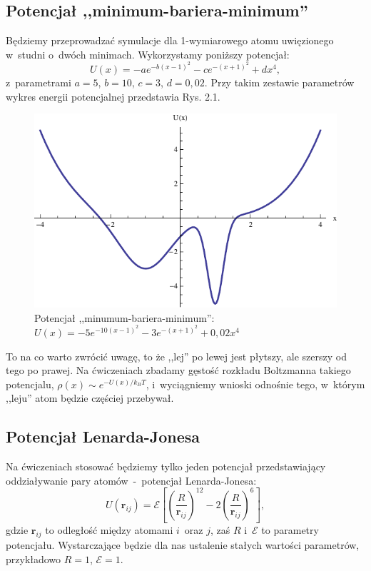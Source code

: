 \documentclass[a4paper,11pt,twoside]{book}
\begin{document}
\subsection{Potencjał ,,minimum-bariera-minimum''}
Będziemy przeprowadzać symulacje dla 1-wymiarowego atomu uwięzionego w~studni o~dwóch minimach. Wykorzystamy poniższy potencjał:
\begin{displaymath}
U(x)=-a e^{-b (x-1)^2}-c e^{-(x+1)^2}+d x^4,
\end{displaymath}
z~parametrami $a=5$, $b=10$, $c=3$, $d=0,02$. Przy takim zestawie parametrów wykres energii potencjalnej przedstawia Rys. 2.1.
\begin{figure}[h!]
\label{potencjal}
\caption[To należy zmienić]
{
Potencjał ,,minumum-bariera-minimum'':\\
\centering
$U(x)=-5 e^{-10 (x-1)^2}-3 e^{-(x+1)^2}+0,02 x^4$
}
\centering
\includegraphics[scale=0.9]{weberPotential}
\end{figure}
To na co warto zwrócić uwagę, to że ,,lej'' po lewej jest płytszy, ale szerszy od tego po prawej. Na ćwiczeniach zbadamy gęstość rozkładu Boltzmanna takiego potencjalu, $\rho (x)\sim e^{-U(x)/k_BT}$, i~wyciągniemy wnioski odnośnie tego, w~którym ,,leju'' atom będzie częściej przebywał.
\subsection{Potencjał Lenarda-Jonesa}
Na ćwiczeniach stosować będziemy tylko jeden potencjał przedstawiający oddziaływanie pary atomów~-~potencjał Lenarda-Jonesa:
\begin{displaymath}
U(\mathbf{r}_{ij}) = \mathcal{E} \left [ \left ( \frac{R}{\mathbf{r}_{ij}} \right )^{12} - 2 \left ( \frac{R}{\mathbf{r}_{ij}} \right )^6  \right ],
\end{displaymath}
gdzie $\mathbf{r}_{ij}$ to odległość między atomami $i$~oraz $j$, zaś $R$ i~$\mathcal{E}$ to parametry potencjału. Wystarczające będzie dla nas ustalenie stałych wartości parametrów, przykładowo $R=1$, $\mathcal{E}=1$.
\end{document}
